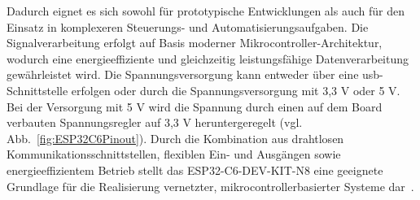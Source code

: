 Dadurch eignet es sich sowohl für prototypische Entwicklungen als auch für den Einsatz in komplexeren Steuerungs- und Automatisierungsaufgaben. 
Die Signalverarbeitung erfolgt auf Basis moderner Mikrocontroller-Architektur, wodurch eine energieeffiziente und gleichzeitig leistungsfähige Datenverarbeitung gewährleistet wird.
Die Spannungsversorgung kann entweder über eine \gls{usb}-Schnittstelle erfolgen oder durch die Spannungsversorgung mit 3,3 V oder 5 V. 
Bei der Versorgung mit 5 V wird die Spannung durch einen auf dem Board verbauten Spannungsregler auf 3,3 V heruntergeregelt (vgl. Abb.~\ref{fig:ESP32C6Pinout}).  
Durch die Kombination aus drahtlosen Kommunikationsschnittstellen, flexiblen Ein- und Ausgängen sowie energieeffizientem Betrieb stellt das ESP32-C6-DEV-KIT-N8 eine geeignete Grundlage für die Realisierung vernetzter, mikrocontrollerbasierter Systeme dar~\cite{WaveshareESP32C6}.
